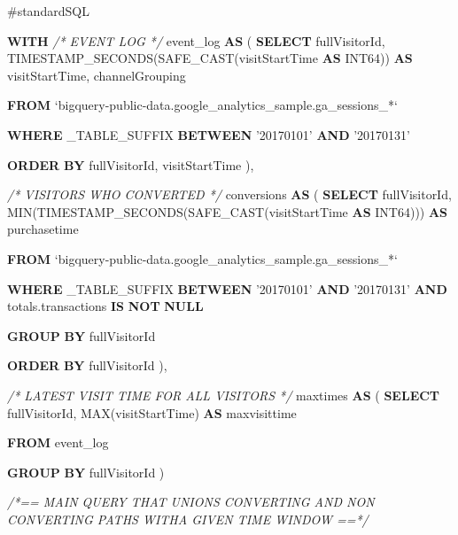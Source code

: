 \documentclass[]{book}
\newenvironment{Shaded}{\begin{snugshade}}{\end{snugshade}}
\newcommand{\KeywordTok}[1]{\textcolor[rgb]{0.13,0.29,0.53}{\textbf{#1}}}
\newcommand{\StringTok}[1]{\textcolor[rgb]{0.31,0.60,0.02}{#1}}
\newcommand{\CommentTok}[1]{\textcolor[rgb]{0.56,0.35,0.01}{\textit{#1}}}
\newcommand{\FunctionTok}[1]{\textcolor[rgb]{0.00,0.00,0.00}{#1}}
\newcommand{\NormalTok}[1]{#1}
\begin{document}
\begin{Shaded}
\begin{Highlighting}[]
\NormalTok{#standardSQL}

\KeywordTok{WITH} 
  \CommentTok{/* EVENT LOG */}
\NormalTok{  event_log }\KeywordTok{AS}\NormalTok{ (}
    \KeywordTok{SELECT}\NormalTok{ fullVisitorId, }
\NormalTok{          TIMESTAMP_SECONDS(SAFE_CAST(visitStartTime }\KeywordTok{AS}\NormalTok{ INT64))  }\KeywordTok{AS}\NormalTok{ visitStartTime,  }
\NormalTok{          channelGrouping}

    \KeywordTok{FROM}\NormalTok{ `bigquery-public-data.google_analytics_sample.ga_sessions_*`}

    \KeywordTok{WHERE}\NormalTok{ _TABLE_SUFFIX }\KeywordTok{BETWEEN} \StringTok{'20170101'} \KeywordTok{AND} \StringTok{'20170131'}

    \KeywordTok{ORDER} \KeywordTok{BY}\NormalTok{ fullVisitorId, visitStartTime}
\NormalTok{  ),}

 \CommentTok{/* VISITORS WHO CONVERTED */}
\NormalTok{ conversions }\KeywordTok{AS}\NormalTok{ (}
    \KeywordTok{SELECT}\NormalTok{ fullVisitorId, }
           \FunctionTok{MIN}\NormalTok{(TIMESTAMP_SECONDS(SAFE_CAST(visitStartTime }\KeywordTok{AS}\NormalTok{ INT64)))  }\KeywordTok{AS}\NormalTok{ purchasetime}

    \KeywordTok{FROM}\NormalTok{ `bigquery-public-data.google_analytics_sample.ga_sessions_*`}

    \KeywordTok{WHERE}\NormalTok{ _TABLE_SUFFIX }\KeywordTok{BETWEEN} \StringTok{'20170101'} \KeywordTok{AND} \StringTok{'20170131'}
     \KeywordTok{AND}\NormalTok{ totals.transactions }\KeywordTok{IS} \KeywordTok{NOT} \KeywordTok{NULL}

    \KeywordTok{GROUP} \KeywordTok{BY}\NormalTok{ fullVisitorId}

    \KeywordTok{ORDER} \KeywordTok{BY}\NormalTok{ fullVisitorId}
\NormalTok{  ),}
  
  \CommentTok{/* LATEST VISIT TIME FOR ALL VISITORS */}
\NormalTok{   maxtimes }\KeywordTok{AS}\NormalTok{ (}
    \KeywordTok{SELECT}\NormalTok{ fullVisitorId, }
    \FunctionTok{MAX}\NormalTok{(visitStartTime) }\KeywordTok{AS}\NormalTok{ maxvisittime}
    
    \KeywordTok{FROM}\NormalTok{ event_log}
    
    \KeywordTok{GROUP} \KeywordTok{BY}\NormalTok{ fullVisitorId}
\NormalTok{  )}

  \CommentTok{/*== MAIN QUERY THAT UNIONS CONVERTING AND NON CONVERTING PATHS WITHA GIVEN TIME WINDOW ==*/}
  

\end{Highlighting}
\end{Shaded}
\end{document}
